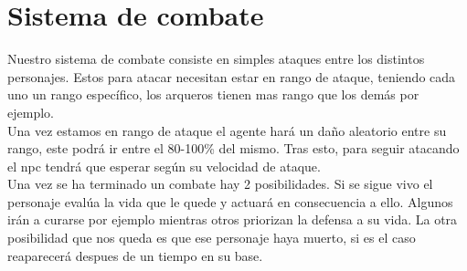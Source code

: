 \section{Sistema de combate}
Nuestro sistema de combate consiste en simples ataques entre los distintos personajes. Estos para atacar necesitan estar en rango de ataque, teniendo cada uno un rango específico, los arqueros tienen mas rango que los demás por ejemplo.\\
Una vez estamos en rango de ataque el agente hará un daño aleatorio entre su rango, este podrá ir entre el 80-100\% del mismo. Tras esto, para seguir atacando el npc tendrá que esperar según su velocidad de ataque.\\
Una vez se ha terminado un combate hay 2 posibilidades. Si se sigue vivo el personaje evalúa la vida que le quede y actuará en consecuencia a ello. Algunos irán a curarse por ejemplo mientras otros priorizan la defensa a su vida. La otra posibilidad que nos queda es que ese personaje haya muerto, si es el caso reaparecerá despues de un tiempo en su base.